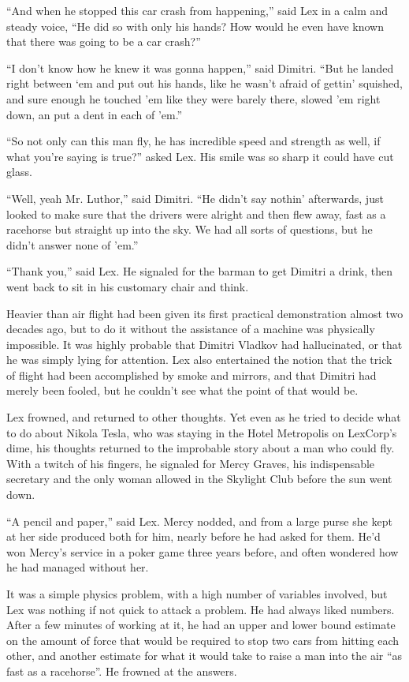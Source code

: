 ``And when he stopped this car crash from happening,'' said Lex in a
calm and steady voice, ``He did so with only his hands? How would he
even have known that there was going to be a car crash?''

``I don't know how he knew it was gonna happen,'' said Dimitri. ``But he
landed right between `em and put out his hands, like he wasn't afraid of
gettin' squished, and sure enough he touched 'em like they were barely
there, slowed 'em right down, an put a dent in each of 'em.''

``So not only can this man fly, he has incredible speed and strength as
well, if what you're saying is true?'' asked Lex. His smile was so sharp
it could have cut glass.

``Well, yeah Mr. Luthor,'' said Dimitri. ``He didn't say nothin'
afterwards, just looked to make sure that the drivers were alright and
then flew away, fast as a racehorse but straight up into the sky. We had
all sorts of questions, but he didn't answer none of 'em.''

``Thank you,'' said Lex. He signaled for the barman to get Dimitri a
drink, then went back to sit in his customary chair and think.

Heavier than air flight had been given its first practical demonstration
almost two decades ago, but to do it without the assistance of a machine
was physically impossible. It was highly probable that Dimitri Vladkov
had hallucinated, or that he was simply lying for attention. Lex also
entertained the notion that the trick of flight had been accomplished by
smoke and mirrors, and that Dimitri had merely been fooled, but he
couldn't see what the point of that would be.

Lex frowned, and returned to other thoughts. Yet even as he tried to
decide what to do about Nikola Tesla, who was staying in the Hotel
Metropolis on LexCorp's dime, his thoughts returned to the improbable
story about a man who could fly. With a twitch of his fingers, he
signaled for Mercy Graves, his indispensable secretary and the only
woman allowed in the Skylight Club before the sun went down.

``A pencil and paper,'' said Lex. Mercy nodded, and from a large purse
she kept at her side produced both for him, nearly before he had asked
for them. He'd won Mercy's service in a poker game three years before,
and often wondered how he had managed without her.

It was a simple physics problem, with a high number of variables
involved, but Lex was nothing if not quick to attack a problem. He had
always liked numbers. After a few minutes of working at it, he had an
upper and lower bound estimate on the amount of force that would be
required to stop two cars from hitting each other, and another estimate
for what it would take to raise a man into the air ``as fast as a
racehorse''. He frowned at the answers.

